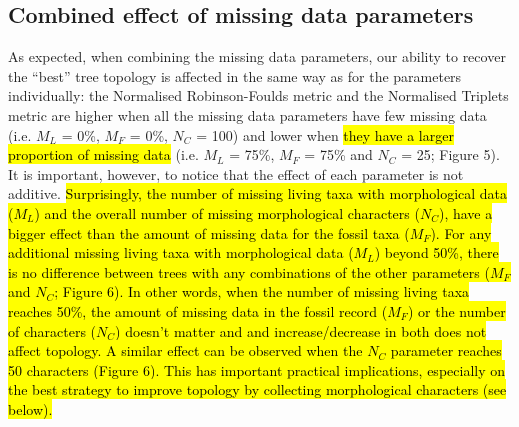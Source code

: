\documentclass[12pt,letterpaper]{article}
\begin{document}
\subsection{Combined effect of missing data parameters}
As expected, when combining the missing data parameters, our ability to recover the ``best'' tree topology is affected in the same way as for the parameters individually: the Normalised Robinson-Foulds metric and the Normalised Triplets metric are higher when all the missing data parameters have few missing data (i.e. $M_{L}$ = 0\%, $M_{F}$ = 0\%, $N_{C}$ = 100) and lower when \hl{they have a larger proportion of missing data} (i.e. $M_{L}$ = 75\%, $M_{F}$ = 75\% and $N_{C}$ = 25; Figure 5).
It is important, however, to notice that the effect of each parameter is not additive.
\hl{Surprisingly, the number of missing living taxa with morphological data ($M_{L}$) and the overall number of missing morphological characters ($N_{C}$), have a bigger effect than the amount of missing data for the fossil taxa ($M_{F}$).
For any additional missing living taxa with morphological data ($M_L$) beyond 50\%, there is no difference between trees with any combinations of the other parameters ($M_F$ and $N_C$; Figure 6).
In other words, when the number of missing living taxa reaches 50\%, the amount of missing data in the fossil record ($M_F$) or the number of characters ($N_C$) doesn't matter and and increase/decrease in both does not affect topology.
A similar effect can be observed when the $N_C$ parameter reaches 50 characters (Figure 6).
This has important practical implications, especially on the best strategy to improve topology by collecting morphological characters (see below).}
\end{document}
